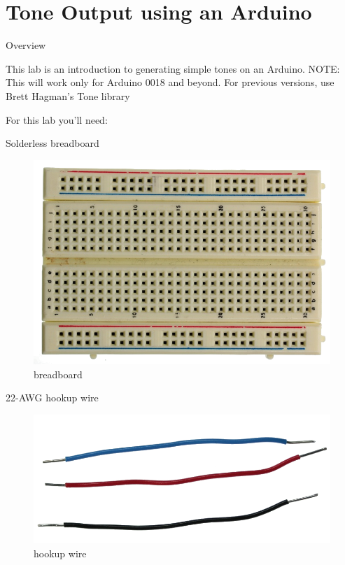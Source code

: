 \chapter{Tone Output using an Arduino}

Overview

This lab is an introduction to generating simple tones on an Arduino. NOTE: This will work only for Arduino 0018 and beyond. For previous versions, use Brett Hagman's Tone library

For this lab you'll need:

Solderless breadboard


\begin{figure}[!htb]
 \centering
 \includegraphics[scale=0.3]{img/toneout/breadboard.png}
 \caption{breadboard}
 \label{breadboard}
\end{figure}


22-AWG hookup wire


\begin{figure}[!htb]
 \centering
 \includegraphics[scale=0.3]{img/toneout/hookup_wire.png}
 \caption{hookup wire}
 \label{hookup wire}
\end{figure}

